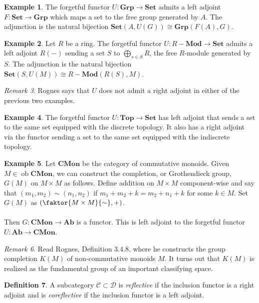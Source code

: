 \documentclass[10pt,letterpaper,cm]{nupset}
\theoremstyle{definition}
\newtheorem{definition}{Definition}
\newtheorem{exmp}[definition]{Example}
\theoremstyle{theorem}
\theoremstyle{remark}
\newtheorem{remark}[definition]{Remark}
\newcommand{\1}{\mathbf{1}}
\renewcommand{\c}{\mathscr{C}}
\renewcommand{\d}{\mathscr{D}}
\newcommand{\0}{\vec 0}
\DeclareMathOperator{\ob}{ob}
\begin{document}
\begin{exmp}
The forgetful functor $U: \mathbf{Grp} \to \mathbf{Set}$ admits a left adjoint $F: \mathbf{Set} \to \mathbf{Grp}$ which maps a set to the free group generated by $A$. The adjunction is the natural bijection $\mathbf{Set}(A, U(G)) \cong \mathbf{Grp}(F(A), G)$.
\end{exmp}

\begin{exmp}
Let $R$ be a ring. The forgetful functor $U: R-\mathbf{Mod}\to \mathbf{Set}$ admits a left adjoint $R(-)$ sending a set $S$ to $\bigoplus_{s\in S} R$, the free $R$-module generated by $S$. The adjunction is the natural bijection $\mathbf{Set}(S, U(M)) \cong R-\mathbf{Mod}(R(S), M)$.
\end{exmp}

\begin{remark}
Rognes says that $U$ does not admit a right adjoint in either of the previous two examples.
\end{remark}

\begin{exmp}
The forgetful functor $U: \mathbf{Top} \to \mathbf{Set}$ has left adjoint that sends a set to the same set equipped with the discrete topology.  It also has a right adjoint via the functor sending a set to the same set equipped with the indiscrete topology.
\end{exmp}

\begin{exmp}
Let $\mathbf{CMon}$ be the category of commutative monoids. Given $M\in \ob \mathbf{CMon}$, we can construct the completion, or Grothendieck group, $G(M)$ on $M\times M$ as follows. Define addition on $M \times M$ component-wise and say that $(m_1, m_2) \sim (n_1, n_2)$ if $m_1 + m_2 + k = m_2 +n_1 +k$ for some $k\in M$. Set $G(M)$ as $(\faktor{M\times M}{\sim}, +)$.
\\ \\
Then $G: \mathbf{CMon} \to \mathbf{Ab}$ is a functor. This is left adjoint to the forgetful functor $U: \mathbf{Ab} \to \mathbf{CMon}$.
\end{exmp}

\begin{remark}
Read Rognes, Definition 3.4.8, where he constructs the group completion $K(M)$ of non-commutative monoids $M$. It turns out that $K(M)$ is realized as the fundamental group of an important classifying space. 
\end{remark}

\begin{definition}
A subcategory $\c \subset \d$ is \textit{reflective} if the inclusion functor is a right adjoint and is \textit{coreflective} if the inclusion functor is a left adjoint. 
\end{definition}
\end{document}

